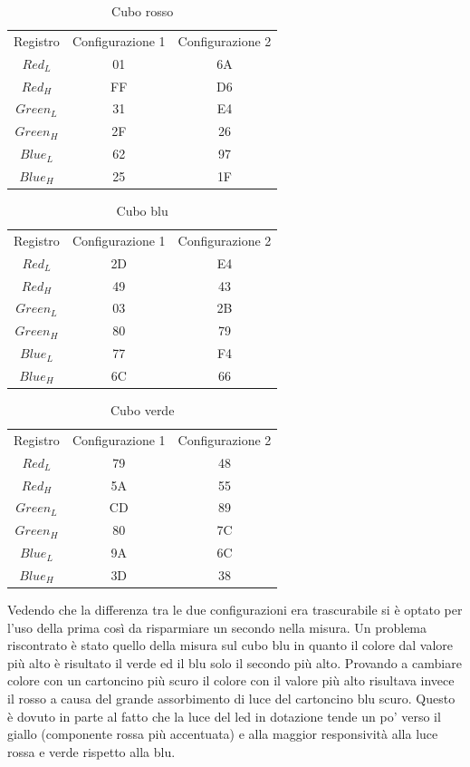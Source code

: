 \documentclass[a4paper,12pt]{report}
\begin{document}
    \begin{table}[h]
        \centering
        \begin{tabular}{ccc}
            Registro & Configurazione 1 & Configurazione 2\\
             $Red_L$& 01 & 6A\\
             $Red_H$& FF & D6\\
             $Green_L$& 31 & E4\\
             $Green_H$& 2F & 26\\
             $Blue_L$& 62 & 97\\
             $Blue_H$& 25 & 1F\\
        \end{tabular}
        \caption{Cubo rosso}
        \label{tab:cubo_rosso}
    \end{table}
    \begin{table}[h]
        \centering
        \begin{tabular}{ccc}
            Registro & Configurazione 1 & Configurazione 2\\
             $Red_L$& 2D & E4\\
             $Red_H$& 49 & 43\\
             $Green_L$& 03 & 2B\\
             $Green_H$& 80 & 79\\
             $Blue_L$& 77 & F4\\
             $Blue_H$& 6C & 66
        \end{tabular}
        \caption{Cubo blu}
        \label{tab:cubo_blu}
        \end{table}
        \begin{table}[h]
        \centering
        \begin{tabular}{ccc}
            Registro & Configurazione 1 & Configurazione 2\\
             $Red_L$& 79 & 48\\
             $Red_H$& 5A & 55\\
             $Green_L$& CD & 89\\
             $Green_H$& 80 & 7C\\
             $Blue_L$& 9A & 6C\\
             $Blue_H$& 3D & 38
        \end{tabular}
        \caption{Cubo verde}
        \label{tab:cubo_verde}
    \end{table}
Vedendo che la differenza tra le due configurazioni era trascurabile si è optato per l'uso della prima così da risparmiare un secondo nella misura.
Un problema riscontrato è stato quello della misura sul cubo blu in quanto il colore dal valore più alto è risultato il verde ed il blu solo il secondo più alto. Provando a cambiare colore con un cartoncino più scuro il colore con il valore più alto risultava invece il rosso a causa del grande assorbimento di luce del cartoncino blu scuro. Questo è dovuto in parte al fatto che la luce del led in dotazione tende un po' verso il giallo (componente rossa più accentuata) e alla maggior responsività alla luce rossa e verde rispetto alla blu.
\end{document}
